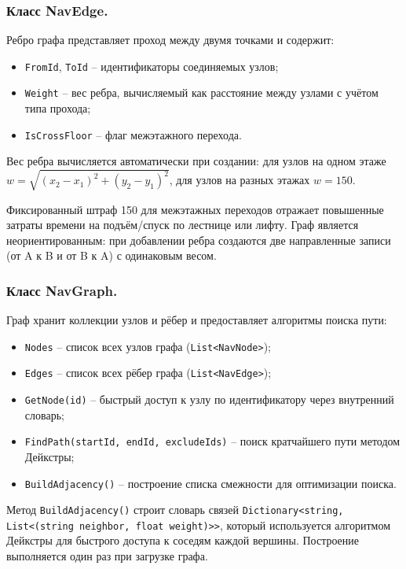 \subsubsection{Класс NavEdge.} 

Ребро графа представляет проход между двумя точками и содержит:
\begin{itemize}
\item \texttt{FromId}, \texttt{ToId} -- идентификаторы соединяемых узлов;
\item \texttt{Weight} -- вес ребра, вычисляемый как расстояние между узлами с учётом типа прохода;
\item \texttt{IsCrossFloor} -- флаг межэтажного перехода.
\end{itemize}

Вес ребра вычисляется автоматически при создании: для узлов на одном этаже $w = \sqrt{(x_2 - x_1)^2 + (y_2 - y_1)^2}$, для узлов на разных этажах $w = 150$.

Фиксированный штраф 150 для межэтажных переходов отражает повышенные затраты времени на подъём/спуск по лестнице или лифту. Граф является неориентированным: при добавлении ребра создаются две направленные записи (от A к B и от B к A) с одинаковым весом.

\subsubsection{Класс NavGraph.} 

Граф хранит коллекции узлов и рёбер и предоставляет алгоритмы поиска пути:

\begin{itemize}
\item \texttt{Nodes} -- список всех узлов графа (\texttt{List<NavNode>});
\item \texttt{Edges} -- список всех рёбер графа (\texttt{List<NavEdge>});
\item \texttt{GetNode(id)} -- быстрый доступ к узлу по идентификатору через внутренний словарь;
\item \texttt{FindPath(startId, endId, excludeIds)} -- поиск кратчайшего пути методом Дейкстры;
\item \texttt{BuildAdjacency()} -- построение списка смежности для оптимизации поиска.
\end{itemize}

Метод \texttt{BuildAdjacency()} строит словарь связей \texttt{Dictionary<string, List<(string neighbor, float weight)>>}, который используется алгоритмом Дейкстры для быстрого доступа к соседям каждой вершины. Построение выполняется один раз при загрузке графа.

